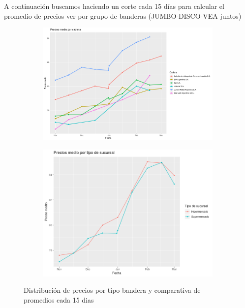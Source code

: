 A continuación buscamos haciendo un corte cada 15 días para calcular el promedio de precios ver por grupo de banderas (JUMBO-DISCO-VEA juntos)

\begin{center}
    
\end{center}







\begin{figure}[h]
\centering
\begin{subfigure}{.5\textwidth}
  \centering
  \includegraphics[width=0.6\paperwidth, height=0.4\paperheight, keepaspectratio]{img/mediaPrecios_vs_bandera.png}
\end{subfigure}%
\begin{subfigure}{.5\textwidth}
  \centering
  \includegraphics[width=0.5\paperwidth, height=0.4\paperheight, keepaspectratio]{img/mediaPrecios_vs_tipoLocal.png}
\end{subfigure}
\caption{Distribución de precios por tipo bandera y comparativa de promedios cada 15 dias}
\label{fig:test}
\end{figure}

